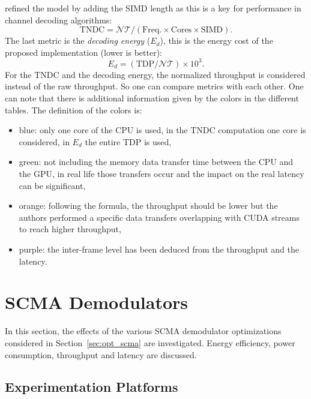 refined the model by adding the SIMD length as this is a key for performance in
channel decoding algorithms:
\begin{equation}
  \text{TNDC} = \mathcal{NT} / (\text{Freq.} \times \text{Cores} \times \text{SIMD}).
\end{equation}
The last metric is the \emph{decoding energy} ($E_d$), this is the energy cost
of the proposed implementation (lower is better):
\begin{equation}
  E_d = (\text{TDP} / \mathcal{NT}) \times 10^3.
\end{equation}
For the TNDC and the decoding energy, the normalized throughput is considered
instead of the raw throughput. So one can compare metrics with each other. One
can note that there is additional information given by the colors in the
different tables. The definition of the colors is:
\begin{itemize}
  \item {\color{Paired-1}blue}: only one core of the CPU is used, in the TNDC
    computation one core is considered, in $E_d$ the entire TDP is used,
  \item {\color{Paired-3}green}: not including the memory data transfer time
    between the CPU and the GPU, in real life those transfers occur and the
    impact on the real latency can be significant,
  \item {\color{Paired-7}orange}: following the formula, the throughput should
    be lower but the authors performed a specific data transfers overlapping
    with CUDA streams to reach higher throughput,
  \item {\color{Paired-9}purple}: the inter-frame level has been deduced from
    the throughput and the latency.
\end{itemize}

\section{SCMA Demodulators}
\label{sec:eval_scma}

In this section, the effects of the various SCMA demodulator optimizations
considered in Section~\ref{sec:opt_scma} are investigated. Energy efficiency,
power consumption, throughput and latency are discussed.

\subsection{Experimentation Platforms}

